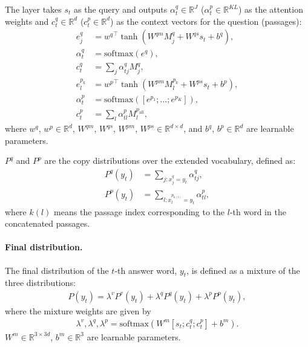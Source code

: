 \documentclass[11pt,a4paper]{article}
\theoremstyle{mydef}
\theoremstyle{myprob}
\begin{document}
The layer takes $s_t$ as the query and outputs $\alpha^q_t \in \mathbb{R}^J$ ($\alpha^p_t \in \mathbb{R}^{KL}$) as the attention weights and $c^q_t \in \mathbb{R}^d$ ($c^p_t \in \mathbb{R}^d$) as the context vectors for the question (passages):
\begin{align}
e^q_j &= {w^q}^\top \tanh(W^{qm} M_j^q + W^{qs} s_t +b^q), \\
\alpha^q_t &= \mathrm{softmax}(e^q), \\ 
c^q_t &= \textstyle \sum_j \alpha^q_{tj} M_j^q, \\
e^{p_k}_l &= {w^p}^\top \tanh(W^{pm} M_l^{p_k} + W^{ps} s_t +b^p), \\
\alpha^p_t &= \mathrm{softmax}([e^{p_1}; \ldots; e^{p_K}]), \\
c^p_t &=  \textstyle \sum_{l} \alpha^p_{tl} M^{p_\mathrm{all}}_{l}, 
\end{align}
where $w^q$, $w^p \in \mathbb{R}^d$, 
$W^{qm}$, $W^{qs}$, $W^{pm}$, $W^{ps}  \in \mathbb{R}^{d \times d}$, and $b^q$, $b^p \in \mathbb{R}^d$ are learnable parameters.

$P^q$ and $P^p$ are the copy distributions over the extended vocabulary, defined as:
\begin{align}
P^q(y_t) &=  \textstyle \sum_{j: x^q_j = y_t} \alpha^q_{tj}, \\
P^p(y_t) &= \textstyle \sum_{l: x^{p_{k(l)}}_{l} = y_t} \alpha^p_{tl},
\end{align}
where $k(l)$ means the passage index corresponding to the $l$-th word in the concatenated passages.


\paragraph{Final distribution.}
The final distribution of the $t$-th answer word, $y_t$, is defined as a mixture of the three distributions:
\begingroup\makeatletter\def\f@size{9.5}\check@mathfonts
\begin{align}
P(y_t) = \lambda^v P^v(y_t) +  \lambda^q P^q(y_t) + \lambda^p P^p(y_t),
\end{align}
\endgroup
where the mixture weights are given by 
\begingroup\makeatletter\def\f@size{9.5}\check@mathfonts
\begin{align}
\lambda^v, \lambda^q, \lambda^p = \mathrm{softmax}(W^m [s_t; c^q_t; c^p_t] + b^m).
\end{align}
\endgroup
$W^m \in \mathbb{R}^{3 \times 3d}$, $b^m \in \mathbb{R}^3$ are learnable parameters.
\end{document}
